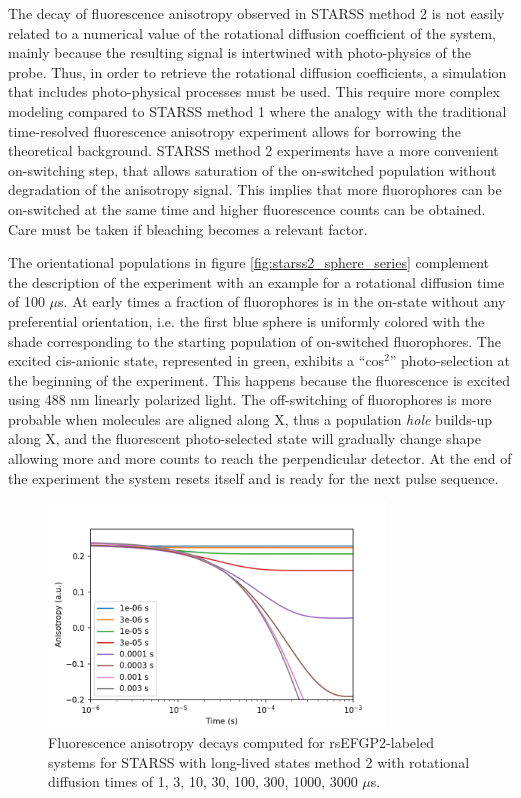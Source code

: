 \documentclass{article}
\begin{document}
The decay of fluorescence anisotropy observed in STARSS method 2 is not easily related to a numerical value of the rotational diffusion coefficient of the system, mainly because the resulting signal is intertwined with photo-physics of the probe. Thus, in order to retrieve the rotational diffusion coefficients, a simulation that includes photo-physical processes must be used.
This require more complex modeling compared to STARSS method 1 where the analogy with the traditional time-resolved fluorescence anisotropy experiment allows for borrowing the theoretical background.
STARSS method 2 experiments have a more convenient on-switching step, that allows saturation of the on-switched population without degradation of the anisotropy signal. This implies that more fluorophores can be on-switched at the same time and higher fluorescence counts can be obtained. Care must be taken if bleaching becomes a relevant factor.

The orientational populations in figure \ref{fig:starss2_sphere_series} complement the description of the experiment with an example for a rotational diffusion time of 100 $\mu$s. At early times a fraction of fluorophores is in the on-state without any preferential orientation, i.e. the first blue sphere is uniformly colored with the shade corresponding to the starting population of on-switched fluorophores. The excited cis-anionic state, represented in green, exhibits a ``cos$^2$'' photo-selection at the beginning of the experiment. This happens because the fluorescence is excited using 488 nm linearly polarized light. The off-switching of fluorophores is more probable when molecules are aligned along X, thus a population \textit{hole} builds-up along X, and the fluorescent photo-selected state will gradually change shape allowing more and more counts to reach the perpendicular detector. At the end of the experiment the system resets itself and is ready for the next pulse sequence.

\begin{figure}[h!]
    \centering
    \includegraphics[width=0.8\textwidth]
    {figures/starss2_anisotropy_multiple_decays.png}
    \caption[Simulated fluorescence anisotropy decays of STARSS method 2]
    {Fluorescence anisotropy decays computed for rsEFGP2-labeled systems for STARSS with long-lived states method 2 with rotational diffusion times of 1, 3, 10, 30, 100, 300, 1000, 3000 $\mu$s.}
    \label{fig:starss2_anisotropy}
\end{figure}
\end{document}
